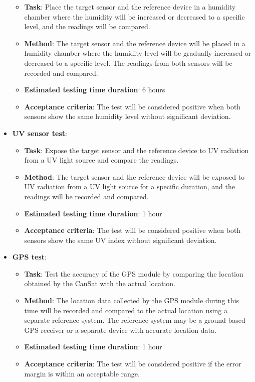 \begin{itemize}[labelwidth=0cm, leftmargin=0cm, itemindent=0.7cm, noitemsep, topsep=0pt, label={}]
\begin{itemize}[labelwidth=2cm, leftmargin=1.9cm, label=, noitemsep, topsep=2pt]
\item[\faTasks] \textbf{Task}:  Place the target sensor and the reference device in a humidity chamber where the humidity will be increased or decreased to a specific level, and the readings will be compared.
\item[\faFlask] \textbf{Method}: The target sensor and the reference device will be placed in a humidity chamber where the humidity level will be gradually increased or decreased to a specific level. The readings from both sensors will be recorded and compared.
\item[{\faHourglass[3]}] \textbf{Estimated testing time duration}:  6 hours
\item[{\faCheckSquare}] \textbf{Acceptance criteria}: The test will be considered positive when both sensors show the same humidity level without significant deviation.
\end{itemize}
\item \textbf{UV sensor test}:
\begin{itemize}[labelwidth=2cm, leftmargin=1.9cm, label=, noitemsep, topsep=2pt]
\item[\faTasks] \textbf{Task}:  Expose the target sensor and the reference device to UV radiation from a UV light source and compare the readings.
\item[\faFlask] \textbf{Method}: The target sensor and the reference device will be exposed to UV radiation from a UV light source for a specific duration, and the readings will be recorded and compared.
\item[{\faHourglass[3]}] \textbf{Estimated testing time duration}:  1 hour
\item[{\faCheckSquare}] \textbf{Acceptance criteria}: The test will be considered positive when both sensors show the same UV index without significant deviation.
\end{itemize}
\item \textbf{GPS test}:
\begin{itemize}[labelwidth=2cm, leftmargin=1.9cm, label=, noitemsep, topsep=2pt]
\item[\faTasks] \textbf{Task}:  Test the accuracy of the GPS module by comparing the location obtained by the CanSat with the actual location.
\item[\faFlask] \textbf{Method}: The location data collected by the GPS module during this time will be recorded and compared to the actual location using a separate reference system. The reference system may be a ground-based GPS receiver or a separate device with accurate location data.
\item[{\faHourglass[3]}] \textbf{Estimated testing time duration}:  1 hour
\item[{\faCheckSquare}] \textbf{Acceptance criteria}: The test will be considered positive if the error margin is within an acceptable range.
\end{itemize}
\end{itemize}
